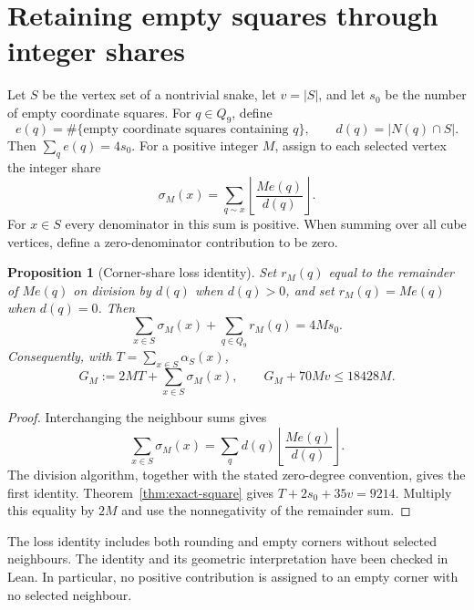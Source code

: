 \documentclass[11pt,a4paper]{article}
\newtheorem{proposition}[theorem]{Proposition}
\theoremstyle{definition}
\theoremstyle{remark}
\newcommand{\Q}{Q}
\begin{document}
\section{Retaining empty squares through integer shares}\label{sec:empty-packing}
Let $S$ be the vertex set of a nontrivial snake, let $v=|S|$, and let $s_0$ be the number of empty coordinate squares. For $q\in\Q_9$, define
\[
e(q)=\#\{\text{empty coordinate squares containing }q\},
\qquad d(q)=|N(q)\cap S|.
\]
Then $\sum_q e(q)=4s_0$. For a positive integer $M$, assign to each selected vertex the integer share
\[
\sigma_M(x)=\sum_{q\sim x}\left\lfloor\frac{M e(q)}{d(q)}\right\rfloor.
\]
For $x\in S$ every denominator in this sum is positive. When summing over all cube vertices, define a zero-denominator contribution to be zero.

\begin{proposition}[Corner-share loss identity]\label{prop:share-loss}
Set $r_M(q)$ equal to the remainder of $M e(q)$ on division by $d(q)$ when $d(q)>0$, and set $r_M(q)=M e(q)$ when $d(q)=0$. Then
\[
\sum_{x\in S}\sigma_M(x)+\sum_{q\in\Q_9}r_M(q)=4M s_0.
\]
Consequently, with $T=\sum_{x\in S}\alpha_S(x)$,
\[
G_M:=2MT+\sum_{x\in S}\sigma_M(x),
\qquad G_M+70Mv\le18428M.
\]
\end{proposition}
\begin{proof}
Interchanging the neighbour sums gives
\[
\sum_{x\in S}\sigma_M(x)=\sum_q d(q)\left\lfloor\frac{M e(q)}{d(q)}\right\rfloor.
\]
The division algorithm, together with the stated zero-degree convention, gives the first identity. Theorem~\ref{thm:exact-square} gives $T+2s_0+35v=9214$. Multiply this equality by $2M$ and use the nonnegativity of the remainder sum.
\end{proof}
The loss identity includes both rounding and empty corners without selected neighbours. The identity and its geometric interpretation have been checked in Lean. In particular, no positive contribution is assigned to an empty corner with no selected neighbour.
\end{document}
